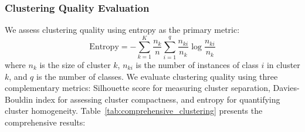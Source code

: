 \documentclass[final,5p,times,twocolumn,numbers]{elsarticle}
\begin{document}
\subsubsection{Clustering Quality Evaluation}
We assess clustering quality using entropy as the primary metric:
\begin{equation}
\text{Entropy} = -\sum_{k=1}^K \frac{n_k}{n} \sum_{i=1}^q \frac{n_{ki}}{n_k} \log \frac{n_{ki}}{n_k}
\end{equation}
where $n_k$ is the size of cluster $k$, $n_{ki}$ is the number of instances of class $i$ in cluster $k$, and $q$ is the number of classes.
We evaluate clustering quality using three complementary metrics: Silhouette score for measuring cluster separation, Davies-Bouldin index for assessing cluster compactness, and entropy for quantifying cluster homogeneity. Table~\ref{tab:comprehensive_clustering} presents the comprehensive results:
\end{document}
